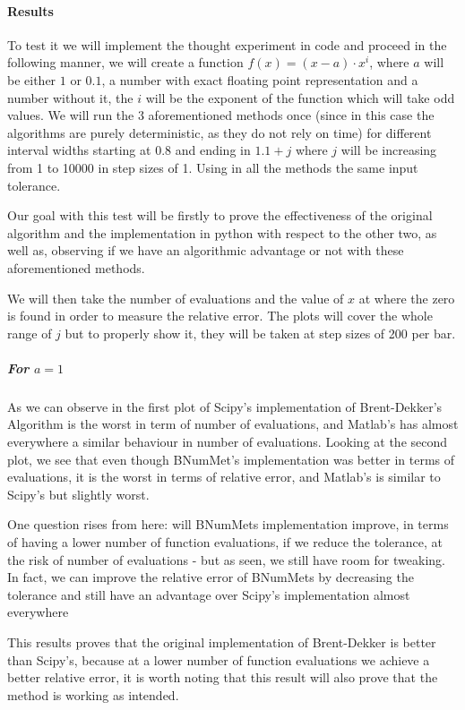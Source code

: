 \paragraph{Results}
To test it we will implement the thought experiment in code and proceed in the following manner, we will create a function $f(x) = (x-a)\cdot x^{i}$, where $a$ will be either $1$ or $0.1$, a number with exact floating point representation and a number without it, the $i$ will be the exponent of the function which will take odd values. We will run the 3 aforementioned methods once (since in this case the algorithms are purely deterministic, as they do not rely on time) for different interval widths starting at $0.8$ and ending in $1.1+j$ where $j$ will be increasing from 1 to 10000 in step sizes of 1. Using in all the methods the same input tolerance.

Our goal with this test will be firstly to prove the effectiveness of the original algorithm and the implementation in python with respect to the other two, as well as, observing if we have an algorithmic advantage or not with these aforementioned methods.

We will then take the number of evaluations and the value of $x$ at where the zero is found in order to measure the relative error. The plots will cover the whole range of $j$ but to properly show it, they will be taken at step sizes of 200 per bar.

\subparagraph{For $a=1$}
As we can observe in the first plot of  Scipy's implementation of Brent-Dekker's Algorithm is the worst in term of number of evaluations, and Matlab's has almost everywhere a similar behaviour in number of evaluations. Looking at the second plot, we see that even though BNumMet's implementation was better in terms of evaluations, it is the worst in terms of relative error, and Matlab's is similar to Scipy's but slightly worst.

One question rises from here: will BNumMets implementation improve, in terms of having a lower number of function evaluations, if we reduce the tolerance, at the risk of number of evaluations - but as seen, we still have room for tweaking. In fact, we can improve the relative error of BNumMets by decreasing the tolerance and still have an advantage over Scipy's implementation almost everywhere 

This results proves that the original implementation of Brent-Dekker is better than Scipy's, because at a lower number of function evaluations we achieve a better relative error, it is worth noting that this result will also prove that the method is working as intended. 


